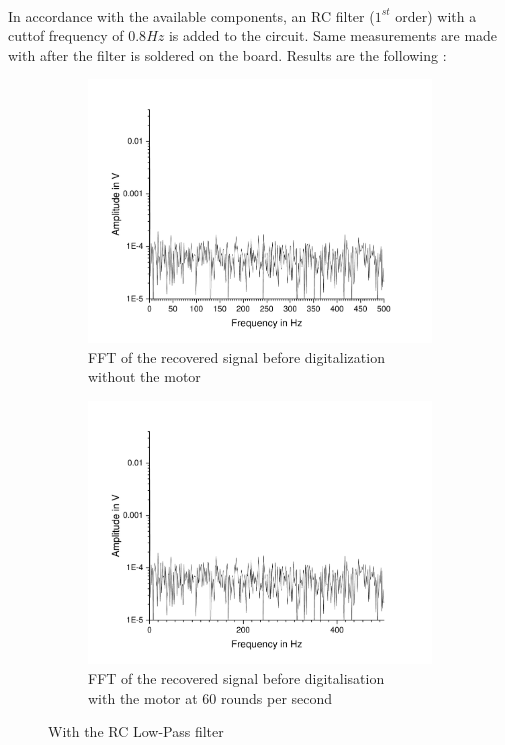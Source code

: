 \documentclass{article}[12pt]
\begin{document}
\paragraph{}
In accordance with the available components, an RC filter ($1^{st}$ order) with a cuttof frequency of $0.8Hz$ is added to the circuit. Same measurements are made with after the filter is soldered on the board. Results are the following : 
\begin{figure}[H]
\centering
\begin{subfigure}{.5\textwidth}
  \centering
  \includegraphics[width=\linewidth]{figures/nomotorfilter.pdf}
  \caption{FFT of the recovered signal before digitalization\\ without the motor}
  \label{fig:nomotornofilter}
\end{subfigure}%
\begin{subfigure}{.5\textwidth}
  \centering
  \includegraphics[width=\linewidth]{figures/motorfilter.pdf}
  \caption{FFT of the recovered signal before digitalisation\\ with the motor at 60 rounds per second}
  \label{fig:motornofilter}
\end{subfigure}
\caption{With the RC Low-Pass filter}
\label{fig:nofilterFFT}
\end{figure}
\end{document}
